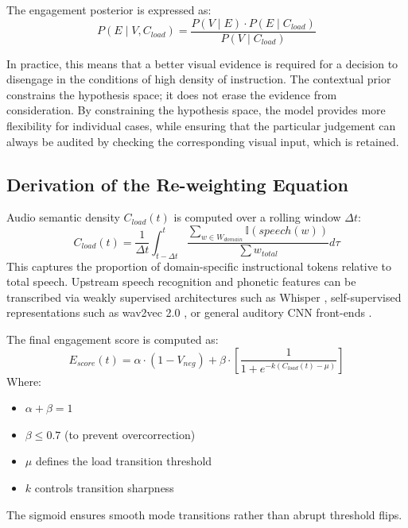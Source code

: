 \documentclass[conference]{IEEEtran}
\begin{document}
The engagement posterior is expressed as:
\begin{equation}
P(E \mid V, C_{load}) = \frac{P(V \mid E) \cdot P(E \mid C_{load})}{P(V \mid C_{load})}
\end{equation}

In practice, this means that a better visual evidence is required for a decision to disengage in the conditions of high density of instruction. The contextual prior constrains the hypothesis space; it does not erase the evidence from consideration. By constraining the hypothesis space, the model provides more flexibility for individual cases, while ensuring that the particular judgement can always be audited by checking the corresponding visual input, which is retained.

\subsection{Derivation of the Re-weighting Equation}
Audio semantic density $C_{load}(t)$ is computed over a rolling window $\Delta t$:
\begin{equation}
C_{load}(t) = \frac{1}{\Delta t} \int_{t-\Delta t}^{t} \frac{\sum_{w \in W_{domain}} \mathbb{I}(speech(w))}{\sum w_{total}} d\tau
\end{equation}
This captures the proportion of domain-specific instructional tokens relative to total speech. Upstream speech recognition and phonetic features can be transcribed via weakly supervised architectures such as Whisper \cite{b13}, self-supervised representations such as wav2vec 2.0 \cite{b22}, or general auditory CNN front-ends \cite{b14}.

The final engagement score is computed as:
\begin{equation}
E_{score}(t) = \alpha \cdot (1 - V_{neg}) + \beta \cdot \left[ \frac{1}{1 + e^{-k(C_{load}(t) - \mu)}} \right]
\end{equation}
Where:
\begin{itemize}
    \item $\alpha + \beta = 1$
    \item $\beta \leq 0.7$ (to prevent overcorrection)
    \item $\mu$ defines the load transition threshold
    \item $k$ controls transition sharpness
\end{itemize}

The sigmoid ensures smooth mode transitions rather than abrupt threshold flips.
\end{document}
